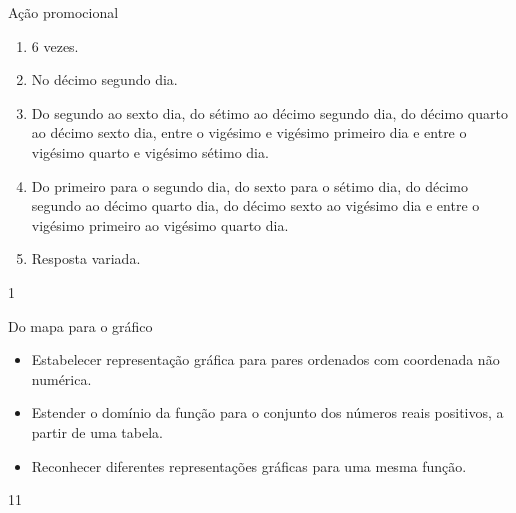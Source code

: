 \clearmargin
\begin{answer}{Ação promocional}
{
\begin{enumerate}

\item $6$ vezes.

\item No décimo segundo dia.

\item Do segundo ao sexto dia, do sétimo ao décimo segundo dia, do décimo quarto ao décimo sexto dia, entre o vigésimo e vigésimo primeiro dia e entre o vigésimo quarto e vigésimo sétimo dia.

\item Do primeiro para o segundo dia, do sexto para o sétimo dia, do décimo segundo ao décimo quarto dia, do décimo sexto ao vigésimo dia e entre o vigésimo primeiro ao vigésimo quarto dia.

\item Resposta variada.

\end{enumerate}
}{1}
\end{answer}
\clearmargin
\begin{objectives}{Do mapa para o gráfico}
{
\begin{itemize}

\item Estabelecer representação gráfica para pares ordenados com coordenada não numérica.

\item Estender o domínio da função para o conjunto dos números reais positivos, a partir de uma tabela.

\item Reconhecer diferentes representações gráficas para uma mesma função.

\end{itemize}
}{1}{1}
\end{objectives}
